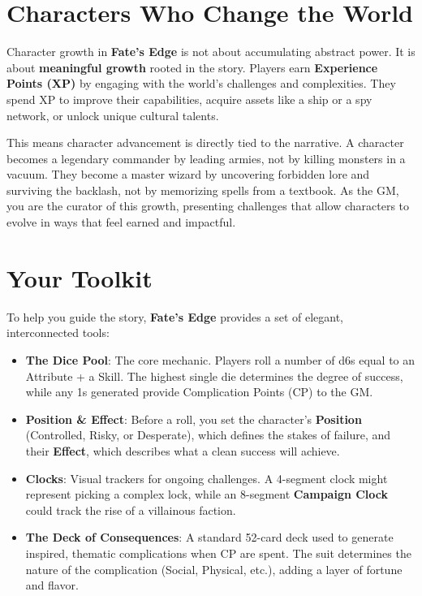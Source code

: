 \section*{Characters Who Change the World}

Character growth in \textbf{Fate's Edge} is not about accumulating abstract power. It is about \textbf{meaningful growth} rooted in the story. Players earn \textbf{Experience Points (XP)} by engaging with the world's challenges and complexities. They spend XP to improve their capabilities, acquire assets like a ship or a spy network, or unlock unique cultural talents.

This means character advancement is directly tied to the narrative. A character becomes a legendary commander by leading armies, not by killing monsters in a vacuum. They become a master wizard by uncovering forbidden lore and surviving the backlash, not by memorizing spells from a textbook. As the GM, you are the curator of this growth, presenting challenges that allow characters to evolve in ways that feel earned and impactful.

\section*{Your Toolkit}

To help you guide the story, \textbf{Fate's Edge} provides a set of elegant, interconnected tools:

\begin{itemize}
    \item \textbf{The Dice Pool}: The core mechanic. Players roll a number of d6s equal to an Attribute + a Skill. The highest single die determines the degree of success, while any 1s generated provide Complication Points (CP) to the GM.
    \item \textbf{Position & Effect}: Before a roll, you set the character's \textbf{Position} (Controlled, Risky, or Desperate), which defines the stakes of failure, and their \textbf{Effect}, which describes what a clean success will achieve.
    \item \textbf{Clocks}: Visual trackers for ongoing challenges. A 4-segment clock might represent picking a complex lock, while an 8-segment \textbf{Campaign Clock} could track the rise of a villainous faction.
    \item \textbf{The Deck of Consequences}: A standard 52-card deck used to generate inspired, thematic complications when CP are spent. The suit determines the nature of the complication (Social, Physical, etc.), adding a layer of fortune and flavor.
\end{itemize}

